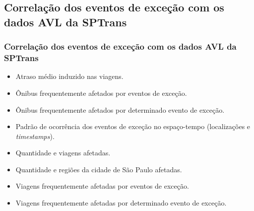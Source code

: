 \documentclass{beamer}
\begin{document}
\subsection{Correlação dos eventos de exceção com os dados AVL da SPTrans}
\begin{frame}
\frametitle{Correlação dos eventos de exceção com os dados AVL da SPTrans}
\begin{itemize}
\item Atraso médio induzido nas viagens.
\item Ônibus frequentemente afetados por eventos de exceção.
\item Ônibus frequentemente afetados por determinado evento de exceção.
\item Padrão de ocorrência dos eventos de exceção no espaço-tempo (localizações e \textit{timestamps}).
\item Quantidade e viagens afetadas.
\item Quantidade e regiões da cidade de São Paulo afetadas.
\item Viagens frequentemente afetadas por eventos de exceção.
\item Viagens frequentemente afetadas por determinado evento de exceção.
\end{itemize}
\end{frame}
\end{document}
